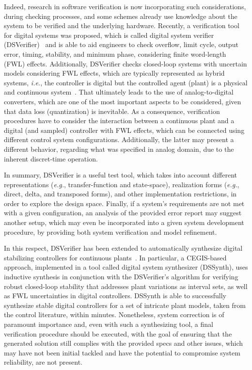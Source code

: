 \documentclass[format=acmsmall, review=false, screen=true]{acmart}
\begin{document}
Indeed, research in software verification is now incorporating such considerations, during checking processes, and some schemes already use knowledge about the system to be verified and the underlying hardware. Recently, a verification tool for digital systems was proposed, which is called digital system verifier (DSVerifier)~\cite{dsv_spin2015,Monteiro16} and is able to aid engineers to check overflow, limit cycle, output error, timing, stability, and minimum phase, considering finite word-length (FWL) effects. Additionally, DSVerifier checks closed-loop systems with uncertain models considering FWL effects, which are typically represented as hybrid systems, {\it i.e.}, the controller is digital but the controlled agent (plant) is a physical and continuous system~\cite{Bessa17}. That ultimately leads to the use of analog-to-digital converters, which are one of the most important aspects to be considered, given that data loss (quantization) is inevitable. As a consequence, verification procedures have to consider the interaction between a continuous plant and a digital (and sampled) controller with FWL effects, which can be connected using different control system configurations. Additionally, the latter may present a different behavior, regarding what was specified in analog domain, due to the inherent discret-time operation. 


In summary, DSVerifier is a useful test tool, which takes into account different representations ({\it e.g.}, transfer-function and state-space), realization forms ({\it e.g.}, direct, delta, and transposed forms), and other implementation restrictions, in order to explore the design space. Finally, if a system's requirements are not met with a given configuration, an analysis of the provided error report may suggest another setup, which may even be incorporated into a given system development procedure, by providing both system verification and model refinement. 

In this respect, DSVerifier has been extended to automatically synthesize digital stabilizing controllers for continuous plants~\cite{Abate17}. In particular, a CEGIS-based approach, implemented in a tool called digital system synthesizer (DSSynth), uses inductive synthesis in conjunction with the DSVerifier's algorithm for verifying robust closed-loop stability that addresses plant variations as interval sets, as well as FWL uncertainties in digital controllers. DSSynth is able to successfully synthesize stable digital controllers for a set of intricate plant models, taken from the control literature, within minutes. Nonetheless, system correction is of paramount importance and, even with such a synthesizing tool, a final verification procedure should be executed, with the goal of ensuring that the generated solution still complies with the provided specs and other issues, which may have not been initial tackled and have the potential to compromise system reliability, are not present.
\end{document}
